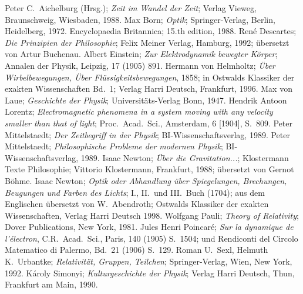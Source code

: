 \begin{thebibliography}{99}
 Peter C.\ Aichelburg (Hrsg.); {\it Zeit im 
       Wandel der Zeit}; Verlag Vieweg, Braunschweig, Wiesbaden, 1988.
 Max Born; {\it Optik}; Springer-Verlag, Berlin, Heidelberg,
        1972.
 Encyclopaedia Britannica; 15.th edition, 1988.
 Ren\'e Descartes; {\it Die Prinzipien der
        Philosophie}; Felix Meiner Verlag, Hamburg, 1992; \"ubersetzt
        von Artur Buchenau.
 Albert Einstein; {\it Zur Elektrodynamik bewegter 
        K\"orper}; Annalen der Physik, Leipzig, 17 (1905) 891. 
 Hermann von Helmholtz; {\em \"Uber Wirbelbewegungen,
        \"Uber Fl\"ussigkeitsbewegungen}, 1858; in Ostwalds Klassiker der 
       exakten Wissenschaften Bd.\ 1; Verlag Harri Deutsch, Frankfurt, 
       1996.                   
 Max von Laue; {\it Geschichte der Physik}; 
         Universit\"ats-Verlag Bonn, 1947.
 Hendrik Antoon Lorentz; {\it Electromagnetic phenomena 
         in a system moving with any velocity smaller than that of light}; 
         Proc.\ Acad.\ Sci., Amsterdam, 6 [1904], S.\ 809.
 Peter Mittelstaedt; {\it Der Zeitbegriff in der
        Physik}; BI-Wissenschaftsverlag, 1989.        
 Peter Mittelstaedt; {\it Philosophische Probleme
        der modernen Physik}; BI-Wissenschaftsverlag, 1989.        
 Isaac Newton; {\it \"Uber die Gravitation...};
       Klostermann Texte Philosophie; Vittorio Klostermann, Frankfurt,
      1988; \"ubersetzt von Gernot B\"ohme.
 Isaac Newton; {\it Optik oder Abhandlung \"uber
      Spiegelungen, Brechungen, Beugungen und Farben des Lichts};
      I., II.\ und III.\ Buch (1704); aus dem Englischen \"ubersetzt
      von W.\ Abendroth; Ostwalds Klassiker der exakten Wissenschaften,
      Verlag Harri Deutsch 1998.   
 Wolfgang Pauli; {\it Theory of Relativity}; Dover
      Publications, New York, 1981.      
 Jules Henri Poincar\'e; {\it Sur la dynamique de 
     l'\'electron}, C.R.\ Acad.\ Sci., Paris, 140 (1905) S.~1504; und 
      Rendiconti del Circolo Matematico di Palermo, Bd.~21 (1906) S.~129.
 Roman U.\ Sexl, Helmuth K.\ Urbantke; {\it Relativit\"at,
      Gruppen, Teilchen}; Springer-Verlag, Wien, New York, 1992.
      K\'aroly Simonyi; {\it Kulturgeschichte der Physik}; Verlag
       Harri Deutsch, Thun, Frankfurt am Main, 1990.
\end{thebibliography}

%
